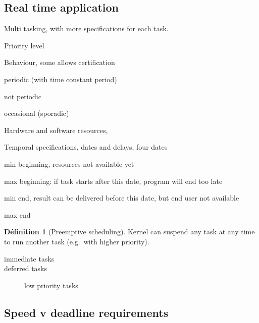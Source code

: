 \documentclass[10pt]{article}
\theoremstyle{plain}
\theoremstyle{definition}
\newtheorem{defn}{Définition}
\theoremstyle{remark}
\begin{document}
\subsection{Real time application}
Multi tasking, with more specifications for each task.
\begin{compactitem}
	\item Priority level
	\item Behaviour, some allows certification
		\begin{compactitem}
			\item periodic (with time constant period)
			\item not periodic
			\item occasional (sporadic)
		\end{compactitem}
	\item Hardware and software resources,
	\item Temporal specifications, dates and delays, four dates
		\begin{compactitem}
			\item min beginning, resources not available yet
			\item max beginning: if task starts after this date, program
				will end too late
			\item min end, result can be delivered before this date, but end
				user not available
			\item max end
		\end{compactitem}
\end{compactitem}

\begin{defn}[Preemptive scheduling]
	Kernel can suspend any task at any time to run another task (e.g.\ with
	higher priority).
\end{defn}

\begin{description}
	\item[immediate tasks]
	\item[deferred tasks]
		low priority tasks
\end{description}

\subsection{Speed v deadline requirements}
\end{document}

